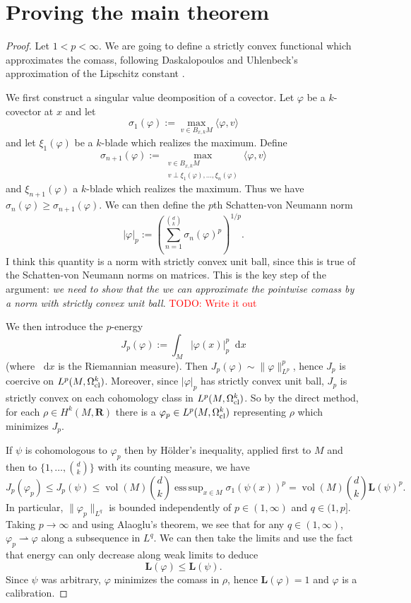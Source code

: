 \documentclass[reqno,11pt]{amsart}
\newcommand{\RR}{\mathbf{R}}
\newcommand*\dif{\mathop{}\!\mathrm{d}}
\DeclareMathOperator{\vol}{vol}
\newcommand{\Comass}{\mathbf L}
\newcommand{\weakto}{\rightharpoonup}
\theoremstyle{definition}
\DeclareMathOperator*{\esssup}{ess\,sup}
\numberwithin{equation}{section}
\newcommand\todo[1]{\textcolor{red}{TODO: #1}}
\begin{document}
\section{Proving the main theorem}
\begin{proof}
Let $1 < p < \infty$.
We are going to define a strictly convex functional which approximates the comass, following Daskalopoulos and Uhlenbeck's approximation of the Lipschitz constant \cite{daskalopoulos2022}.

We first construct a singular value deomposition of a covector.
Let $\varphi$ be a $k$-covector at $x$ and let 
$$\sigma_1(\varphi) := \max_{v \in B_{x, k} M} \langle \varphi, v\rangle$$
and let $\xi_1(\varphi)$ be a $k$-blade which realizes the maximum.
Define 
$$\sigma_{n + 1}(\varphi) := \max_{\substack{v \in B_{x, k} M \\ v \perp \xi_1(\varphi), \dots, \xi_n(\varphi)}} \langle \varphi, v\rangle$$
and $\xi_{n + 1}(\varphi)$ a $k$-blade which realizes the maximum.
Thus we have $\sigma_n(\varphi) \geq \sigma_{n + 1}(\varphi)$.
We can then define the $p$th Schatten-von Neumann norm 
$$|\varphi|_p := \left(\sum_{n=1}^{\binom dk} \sigma_n(\varphi)^p\right)^{1/p}.$$
I think this quantity is a norm with strictly convex unit ball, since this is true of the Schatten-von Neumann norms on matrices.
This is the key step of the argument: \emph{we need to show that the we can approximate the pointwise comass by a norm with strictly convex unit ball}. \todo{Write it out}

We then introduce the $p$-energy
$$J_p(\varphi) := \int_M |\varphi(x)|_p^p \dif x$$
(where $\dif x$ is the Riemannian measure).
Then $J_p(\varphi) \sim \|\varphi\|_{L^p}^p$, hence $J_p$ is coercive on $L^p(M, \Omega^k_{\rm cl})$.
Moreover, since $|\varphi|_p$ has strictly convex unit ball, $J_p$ is strictly convex on each cohomology class in $L^p(M, \Omega^k_{\rm cl})$.
So by the direct method, for each $\rho \in H^k(M, \RR)$ there is a $\varphi_p \in L^p(M, \Omega^k_{\rm cl})$ representing $\rho$ which minimizes $J_p$.

If $\psi$ is cohomologous to $\varphi_p$ then by H\"older's inequality, applied first to $M$ and then to $\{1, \dots, \binom dk\}$ with its counting measure, we have
$$J_p(\varphi_p) \leq J_p(\psi) \leq \vol(M) \binom dk \esssup_{x \in M} \sigma_1(\psi(x))^p = \vol(M) \binom dk \Comass(\psi)^p.$$
In particular, $\|\varphi_p\|_{L^q}$ is bounded independently of $p \in (1, \infty)$ and $q \in (1, p]$.
Taking $p \to \infty$ and using Alaoglu's theorem, we see that for any $q \in (1, \infty)$, $\varphi_p \weakto \varphi$ along a subsequence in $L^q$.
We can then take the limits and use the fact that energy can only decrease along weak limits to deduce 
$$\Comass(\varphi) \leq \Comass(\psi).$$
Since $\psi$ was arbitrary, $\varphi$ minimizes the comass in $\rho$, hence $\Comass(\varphi) = 1$ and $\varphi$ is a calibration.
\end{proof}
\end{document}
